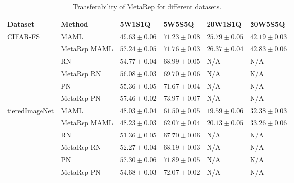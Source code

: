 \begin{table}[htbp]
    \caption{Transferability of MetaRep for different datasets.}
    \begin{adjustbox}{width=0.9\linewidth,center}
    \fontsize{9}{9}\selectfont
    \begin{tabular}{llllll}
    \toprule
    \bf Dataset  & \bf Method    &  \bf 5W1S1Q & \bf 5W5S5Q &  \bf 20W1S1Q & \bf 20W5S5Q \\
    \midrule
    \multirow{6}{*}{CIFAR-FS}       
    & MAML          & $49.63 \pm 0.06$ & $71.23 \pm 0.08$ & $25.79 \pm 0.05$ & $42.19 \pm 0.03$ \\
    & MetaRep MAML  & $53.24 \pm 0.05$ & $71.76 \pm 0.03$ & $26.37 \pm 0.04$ & $42.83 \pm 0.06$ \\
    & RN            & $54.77 \pm 0.04$ & $68.99 \pm 0.05$ & N/A              & N/A              \\
    & MetaRep RN    & $56.08 \pm 0.03$ & $69.70 \pm 0.06$ & N/A              & N/A              \\
    & PN            & $55.36 \pm 0.05$ & $71.67 \pm 0.04$ & N/A              & N/A              \\
    & MetaRep PN    & $57.46 \pm 0.02$ & $73.97 \pm 0.07$ & N/A              & N/A              \\
    \midrule
    \multirow{6}{*}{tieredImageNet} 
    & MAML          & $48.03 \pm 0.04$ & $61.50 \pm 0.05$ & $19.59 \pm 0.06$ & $32.38 \pm 0.03$ \\
    & MetaRep MAML  & $48.23 \pm 0.03$ & $62.07 \pm 0.04$ & $20.13 \pm 0.05$ & $33.26 \pm 0.06$ \\
    & RN            & $51.36 \pm 0.05$ & $67.70 \pm 0.06$ & N/A              & N/A              \\
    & MetaRep RN    & $52.27 \pm 0.04$ & $68.19 \pm 0.03$ & N/A              & N/A              \\
    & PN            & $53.30 \pm 0.06$ & $71.89 \pm 0.05$ & N/A              & N/A              \\
    & MetaRep PN    & $54.68 \pm 0.03$ & $72.07 \pm 0.02$ & N/A              & N/A              \\
    \bottomrule
    \end{tabular}
    \end{adjustbox}
    \label{tab:transfer}
  \end{table}
  
